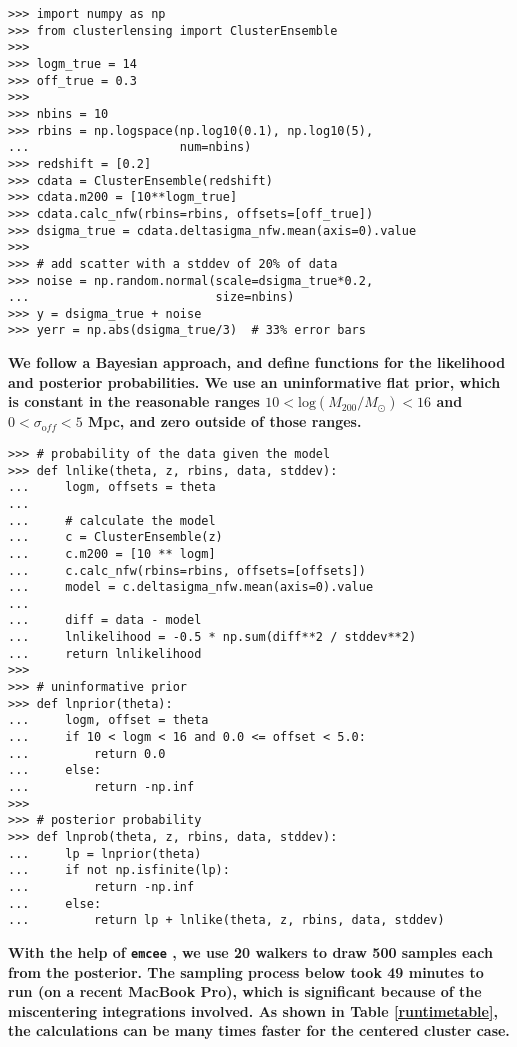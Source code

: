 \documentclass[twocolumn]{aastex6}
\newcommand{\code}{\lstinline[style=codeintext]}
\begin{document}
\begin{verbatim}
>>> import numpy as np
>>> from clusterlensing import ClusterEnsemble
>>> 
>>> logm_true = 14
>>> off_true = 0.3
>>> 
>>> nbins = 10
>>> rbins = np.logspace(np.log10(0.1), np.log10(5), 
...                     num=nbins)
>>> redshift = [0.2]
>>> cdata = ClusterEnsemble(redshift)
>>> cdata.m200 = [10**logm_true]
>>> cdata.calc_nfw(rbins=rbins, offsets=[off_true])
>>> dsigma_true = cdata.deltasigma_nfw.mean(axis=0).value
>>> 
>>> # add scatter with a stddev of 20% of data
>>> noise = np.random.normal(scale=dsigma_true*0.2, 
...                          size=nbins)
>>> y = dsigma_true + noise
>>> yerr = np.abs(dsigma_true/3)  # 33% error bars
\end{verbatim}

{\bf We follow a Bayesian approach, and define functions for the likelihood and posterior probabilities. We use an uninformative flat prior, which is constant in the reasonable ranges $10 < \mathrm{log}(M_{200}/M_{\odot}) < 16$ and $0 < \sigma_{\mathrm off} < 5$ Mpc, and zero outside of those ranges.}

\pagebreak

\begin{verbatim}
>>> # probability of the data given the model
>>> def lnlike(theta, z, rbins, data, stddev):
...     logm, offsets = theta
...     
...     # calculate the model
...     c = ClusterEnsemble(z)
...     c.m200 = [10 ** logm]
...     c.calc_nfw(rbins=rbins, offsets=[offsets])
...     model = c.deltasigma_nfw.mean(axis=0).value
...     
...     diff = data - model
...     lnlikelihood = -0.5 * np.sum(diff**2 / stddev**2)
...     return lnlikelihood
>>>
>>> # uninformative prior
>>> def lnprior(theta):
...     logm, offset = theta
...     if 10 < logm < 16 and 0.0 <= offset < 5.0:
...         return 0.0
...     else:
...         return -np.inf
>>>
>>> # posterior probability
>>> def lnprob(theta, z, rbins, data, stddev):
...     lp = lnprior(theta)
...     if not np.isfinite(lp):
...         return -np.inf
...     else:
...         return lp + lnlike(theta, z, rbins, data, stddev)
\end{verbatim}

{\bf With the help of \code{emcee} \citep{emcee}, we use 20 walkers to draw 500 samples each from the posterior. The sampling process below took 49 minutes to run (on a recent MacBook Pro), which is significant because of the miscentering integrations involved. As shown in Table \ref{runtimetable}, the calculations can be many times faster for the centered cluster case.}
\end{document}
